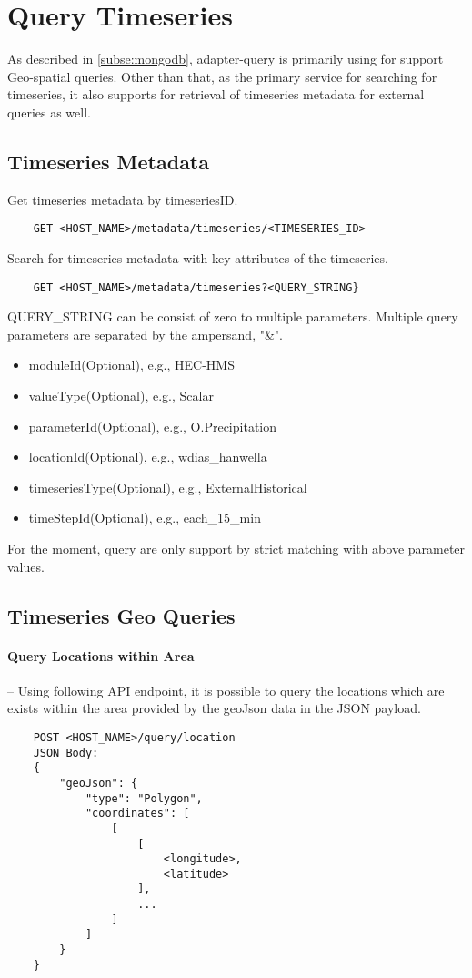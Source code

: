 \section{Query Timeseries}
\label{se:query}

As described in \cref{subse:mongodb}, adapter-query is primarily using for support Geo-spatial queries. Other than that, as the primary service for searching for timeseries, it also supports for retrieval of timeseries metadata for external queries as well.

\subsection{Timeseries Metadata}
Get timeseries metadata by timeseriesID.
\begin{lstlisting}
    GET <HOST_NAME>/metadata/timeseries/<TIMESERIES_ID>
\end{lstlisting}

Search for timeseries metadata with key attributes of the timeseries.
\begin{lstlisting}
    GET <HOST_NAME>/metadata/timeseries?<QUERY_STRING}
\end{lstlisting}

QUERY\_STRING can be consist of zero to multiple parameters. Multiple query parameters are separated by the ampersand, "\&".
\begin{itemize}
    \item moduleId(Optional), e.g., HEC-HMS
    \item valueType(Optional), e.g., Scalar
    \item parameterId(Optional), e.g., O.Precipitation
    \item locationId(Optional), e.g., wdias\_hanwella
    \item timeseriesType(Optional), e.g., ExternalHistorical
    \item timeStepId(Optional), e.g., each\_15\_min
\end{itemize}
For the moment, query are only support by strict matching with above parameter values.

\subsection{Timeseries Geo Queries}

\paragraph{Query Locations within Area}-- Using following API endpoint, it is possible to query the locations which are exists within the area provided by the geoJson data in the JSON payload.
\begin{lstlisting}
    POST <HOST_NAME>/query/location
    JSON Body:
    {
        "geoJson": {
            "type": "Polygon",
            "coordinates": [
                [
                    [
                        <longitude>,
                        <latitude>
                    ],
                    ...
                ]
            ]
        }
    }
\end{lstlisting}

